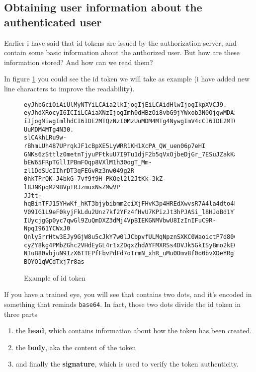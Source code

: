 \subsection{Obtaining user information about the authenticated user}
Earlier i have said that id tokens are issued by the authorization server, and contain some basic information about the authorized user.
But how are these information stored? And how can we read them?

In figure \ref{fig:id_token} you could see the id token we will take as example
(i have added new line characters to improve the readability).

\begin{figure}[h]
\begin{verbatim}
eyJhbGciOiAiUlMyNTYiLCAia2lkIjogIjEiLCAidHlwIjogIkpXVCJ9.
eyJhdXRocyI6ICIiLCAiaXNzIjogImh0dHBzOi8vbG9jYWxob3N0OjgwMDAiLCAic3V
iIjogMiwgImlhdCI6IDE2MTQzNzI0MzUuMDM4MTg4NywgImV4cCI6IDE2MTQzNzYwMz
UuMDM4MTg4N30.
slCAkhLRu9w-rBhmLUh487UPrqkJF1cBpXE5LyWRR1KH1XcPA_QW_uen06p7eHI
GNKs6zSttlz0metnTjyuPFtkuU7I9Tu1djF2b5qVxOjbeDjGr_7ESuJZakKa7ljMloR
bEW65FRpTGllIPBmFOqp8VXlM1h30ogT_Mm-zl1DoSUcIIhrDT3qFEGvRz3nw049g2R
0hkTPrQK-J4bkG-7vf9f9H_PKOel2l2JtKk-3kZ-l8JNKpqM29BVpTRJzmuxNsZMwVP
JJtt-hqBinTFJ15YHwKf_hKT3bjybibmm2ciXjFHvK3p4HREdXwvsR7A4la4dto4FCt
V09IG1L9eF0kyjFkLdu2Unz7kf2YFz4fHvU7KPizJt3hPJASi_l8HJoBd1Y7sTPsjxf
IUycjgGp0yc7qwGl9ZuQmDXZ3dMj4VpBIEKGNMVbwU8IzInIFuC9R-NpqI961YCWxJ0
Qnly5rrHtw3EJy9GjW8u5cJkY7w0lJCbpvfULMqNpznSXKC0WaoictP7d80CKc9LwER
cyZY8kg4PMbZGhc2VHdEyGL4r1xZDqxZhdAYFMXRSs4DVJk5GkISyBmo2kE0rR3QYTA
NIuB80vbjuN9IzX6TTEPfFbvPdFd7oTrmN_xhR_uMu0Omv8f0o0bvXDeYRg1fL6AWFa
BOYO1qWCdTxj7r8as
\end{verbatim}
\caption{Example of id token}
\label{fig:id_token}
\end{figure}

If you have a trained eye, you will see that contains two dots, and it's
encoded in something that reminds \texttt{base64}.
In fact, those two dots divide the id token in three parts

\begin{enumerate}
    \item the \textbf{head}, which contains information about how the token has been created.
    \item the \textbf{body}, aka the content of the token
    \item and finally the \textbf{signature}, which is used to verify the token authenticity.
\end{enumerate}

